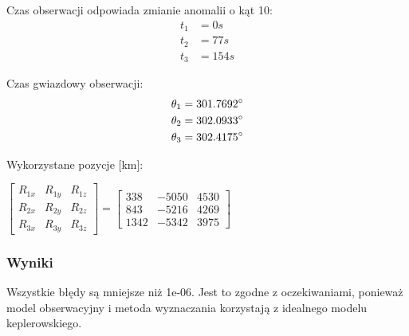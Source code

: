     Czas obserwacji odpowiada zmianie anomalii o kąt 10\degree: 
        \begin{align*}
            t_{1} &= 0 s \\
            t_{2} &= 77 s  \\
            t_{3} &= 154 s
        \end{align*}    
        
    Czas gwiazdowy obserwacji: 
        \begin{align*}
            \theta_1 &= 301.7692\degree \\
            \theta_2 &= 302.0933\degree  \\
            \theta_3 &= 302.4175\degree
        \end{align*}

    Wykorzystane pozycje [km]: 
   
            \begin{center}
              $\begin{bmatrix}
                R_{1x} & R_{1y} & R_{1z} \\
                R_{2x} & R_{2y} & R_{2z} \\
                R_{3x} & R_{3y} & R_{3z} 
            \end{bmatrix}
            =
            \begin{bmatrix}
                338 & -5050 & 4530 \\
                843 & -5216 & 4269 \\
                1342 & -5342 & 3975
            \end{bmatrix}    $
        \end{center}

    \subsubsection{Wyniki}
    
    Wszystkie błędy są mniejsze niż 1e-06. Jest to zgodne z oczekiwaniami, ponieważ model obserwacyjny i metoda wyznaczania korzystają z idealnego modelu keplerowskiego.


